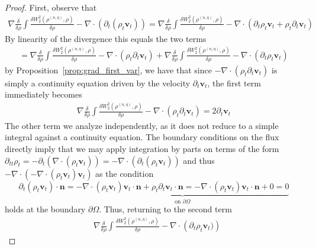 \documentclass[10pt,a4paper]{amsart}
\begin{document}
\begin{proof}
First, observe that
\begin{align*}
\nabla\frac{\delta}{\delta\rho} \int \frac{\delta W_{2}^{2}(\rho^{(n,\eta)}, \rho) }{\delta \rho} - \nabla\cdot\left( \partial_{t} (\rho_{t} \mathbf{v}_{t}  
    ) \right) = \nabla\frac{\delta}{\delta\rho} \int \frac{\delta W_{2}^{2}(\rho^{(n,\eta)}, \rho) }{\delta \rho} - \nabla\cdot\left( \partial_{t} \rho_{t} \mathbf{v}_{t}  + \rho_{t} \partial_{t} \mathbf{v}_{t}
     \right)
\end{align*}
By linearity of the divergence this equals the two terms
\begin{align*}
    = \nabla\frac{\delta}{\delta\rho} \int \frac{\delta W_{2}^{2}(\rho^{(n,\eta)}, \rho) }{\delta \rho} - \nabla\cdot\left( \rho_{t} \partial_{t} \mathbf{v}_{t}
     \right) + \nabla\frac{\delta}{\delta\rho} \int \frac{\delta W_{2}^{2}(\rho^{(n,\eta)}, \rho) }{\delta \rho} - \nabla\cdot\left( \partial_{t} \rho_{t} \mathbf{v}_{t} 
     \right)
\end{align*}
by Proposition~\ref{prop:grad_first_var}, we have that since $- \nabla\cdot\left( \rho_{t} \partial_{t} \mathbf{v}_{t}
     \right)$ is simply a continuity equation driven by the velocity $\partial_{t} \mathbf{v}_{t}$, the first term immediately becomes
\begin{align*}
    \nabla\frac{\delta}{\delta\rho} \int \frac{\delta W_{2}^{2}(\rho^{(n,\eta)}, \rho) }{\delta \rho} - \nabla\cdot\left( \rho_{t} \partial_{t} \mathbf{v}_{t}
     \right) = 2 \partial_{t} \mathbf{v}_{t}
\end{align*}
The other term we analyze independently, as it does not reduce to a simple integral against a continuity equation. The boundary conditions on the flux directly imply that we may apply integration by parts on terms of the form $\partial_{tt} \rho_{t}  = - \partial_{t}( \nabla \cdot (\rho_{t} \mathbf{v}_{t} ))  = -\nabla \cdot (\partial_{t}(\rho_{t} \mathbf{v}_{t}))$ and thus $-\nabla \cdot (-\nabla \cdot\left(\rho_{t} \mathbf{v}_{t}\right) \mathbf{v}_{t} ) $ as the condition
\[
\partial_{t} (\rho_{t} \mathbf{v}_{t}) \cdot \bm{n} = \underbrace{-\nabla \cdot\left(\rho_{t} \mathbf{v}_{t}\right) \mathbf{v}_{t} \cdot \bm{n} + \rho_{t} \partial_{t}\mathbf{v}_{t} \cdot \bm{n} = -\nabla \cdot\left(\rho_{t} \mathbf{v}_{t}\right) \mathbf{v}_{t} \cdot \bm{n} +0 = 0}_{\text{on }\partial \Omega}
\]
holds at the boundary $\partial \Omega$. Thus, returning to the second term
\begin{align*}
    & \nabla\frac{\delta}{\delta\rho} \int \frac{\delta W_{2}^{2}(\rho^{(n,\eta)}, \rho) }{\delta \rho} - \nabla\cdot\left( \partial_{t} \rho_{t} \mathbf{v}_{t}) \right) 

\end{align*}
\end{proof}
\end{document}
